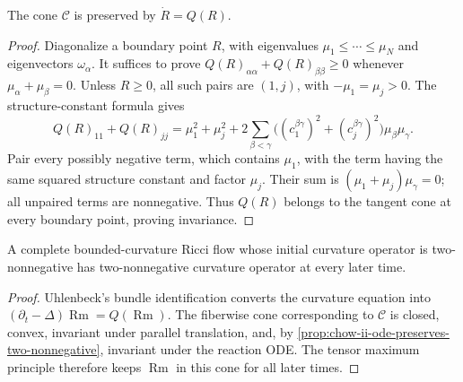 \begin{proposition}
  \label{prop:chow-ii-ode-preserves-two-nonnegative}
  The cone \(\mathcal C\) is preserved by \(\dot R=Q(R)\).
\end{proposition}
\begin{proof}
\sketch
  Diagonalize a boundary point \(R\), with eigenvalues
  \(\mu_1\le\cdots\le\mu_N\) and eigenvectors \(\omega_\alpha\).  It suffices
  to prove \(Q(R)_{\alpha\alpha}+Q(R)_{\beta\beta}\ge0\) whenever
  \(\mu_\alpha+\mu_\beta=0\).  Unless \(R\ge0\), all such pairs are
  \((1,j)\), with \(-\mu_1=\mu_j>0\).  The structure-constant formula gives
  \[
  Q(R)_{11}+Q(R)_{jj}=\mu_1^2+\mu_j^2+
  2\sum_{\beta<\gamma}\bigl((c_1^{\beta\gamma})^2+
  (c_j^{\beta\gamma})^2\bigr)\mu_\beta\mu_\gamma.
  \]
  Pair every possibly negative term, which contains \(\mu_1\), with the
  term having the same squared structure constant and factor \(\mu_j\).
  Their sum is \((\mu_1+\mu_j)\mu_\gamma=0\); all unpaired terms are
  nonnegative.  Thus \(Q(R)\) belongs to the tangent cone at every boundary
  point, proving invariance.
\end{proof}

\begin{proposition}
  \label{prop:chow-ii-ricci-flow-preserves-two-nonnegative}
  A complete bounded-curvature Ricci flow whose initial curvature operator is
  two-nonnegative has two-nonnegative curvature operator at every later time.
\end{proposition}
\begin{proof}
\sketch
  Uhlenbeck's bundle identification converts the curvature equation into
  \((\partial_t-\Delta)\operatorname{Rm}=Q(\operatorname{Rm})\).  The fiberwise
  cone corresponding to \(\mathcal C\) is closed, convex, invariant under
  parallel translation, and, by
  \ref{prop:chow-ii-ode-preserves-two-nonnegative}, invariant under the
  reaction ODE.  The tensor maximum principle therefore keeps
  \(\operatorname{Rm}\) in this cone for all later times.
\end{proof}

